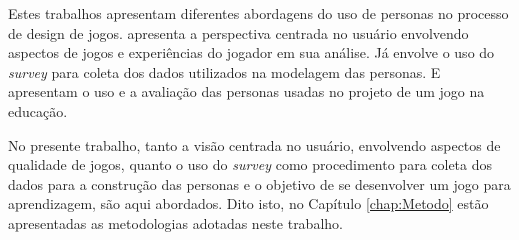 Estes trabalhos apresentam diferentes abordagens do uso de personas no processo de design de jogos.  apresenta a perspectiva centrada no usuário envolvendo aspectos de jogos e experiências do jogador em sua análise. Já  envolve o uso do \textit{survey} para coleta dos dados utilizados na modelagem das personas. E  apresentam o uso e a avaliação das personas usadas no projeto de um jogo na educação.

No presente trabalho, tanto a visão centrada no usuário, envolvendo aspectos de qualidade de jogos, quanto o uso do \textit{survey} como procedimento para coleta dos dados para a construção das personas e o objetivo de se desenvolver um jogo para aprendizagem, são aqui abordados. Dito isto, no Capítulo \ref{chap:Metodo} estão apresentadas as metodologias adotadas neste trabalho.